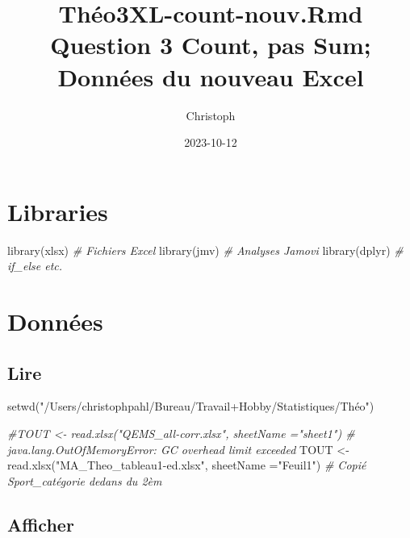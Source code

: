 \documentclass[
]{article}
\title{Théo3XL-count-nouv.Rmd Question 3 Count, pas Sum; Données du
nouveau Excel}
\author{Christoph}
\date{2023-10-12}
\newenvironment{Shaded}{\begin{snugshade}}{\end{snugshade}}
\newcommand{\AttributeTok}[1]{\textcolor[rgb]{0.77,0.63,0.00}{#1}}
\newcommand{\CommentTok}[1]{\textcolor[rgb]{0.56,0.35,0.01}{\textit{#1}}}
\newcommand{\FunctionTok}[1]{\textcolor[rgb]{0.00,0.00,0.00}{#1}}
\newcommand{\NormalTok}[1]{#1}
\newcommand{\OtherTok}[1]{\textcolor[rgb]{0.56,0.35,0.01}{#1}}
\newcommand{\StringTok}[1]{\textcolor[rgb]{0.31,0.60,0.02}{#1}}
\begin{document}
\maketitle

\hypertarget{libraries}{%
\section{Libraries}\label{libraries}}

\begin{Shaded}
\begin{Highlighting}[]
\FunctionTok{library}\NormalTok{(xlsx)                                         }\CommentTok{\# Fichiers Excel}
\FunctionTok{library}\NormalTok{(jmv)                                          }\CommentTok{\# Analyses Jamovi}
\FunctionTok{library}\NormalTok{(dplyr)                                        }\CommentTok{\# if\_else etc.}
\end{Highlighting}
\end{Shaded}

\hypertarget{donnuxe9es}{%
\section{Données}\label{donnuxe9es}}

\hypertarget{lire}{%
\subsection{Lire}\label{lire}}

\begin{Shaded}
\begin{Highlighting}[]
\FunctionTok{setwd}\NormalTok{(}\StringTok{"/Users/christophpahl/Bureau/Travail+Hobby/Statistiques/Théo"}\NormalTok{)}

\CommentTok{\#TOUT \textless{}{-} read.xlsx("QEMS\_all{-}corr.xlsx", sheetName ="sheet1")  \# java.lang.OutOfMemoryError: GC overhead limit exceeded}
\NormalTok{TOUT }\OtherTok{\textless{}{-}} \FunctionTok{read.xlsx}\NormalTok{(}\StringTok{"MA\_Theo\_tableau1{-}ed.xlsx"}\NormalTok{, }\AttributeTok{sheetName =}\StringTok{"Feuil1"}\NormalTok{)    }\CommentTok{\# Copié Sport\_catégorie dedans du 2èm}
\end{Highlighting}
\end{Shaded}

\hypertarget{afficher}{%
\subsection{Afficher}\label{afficher}}
\end{document}
